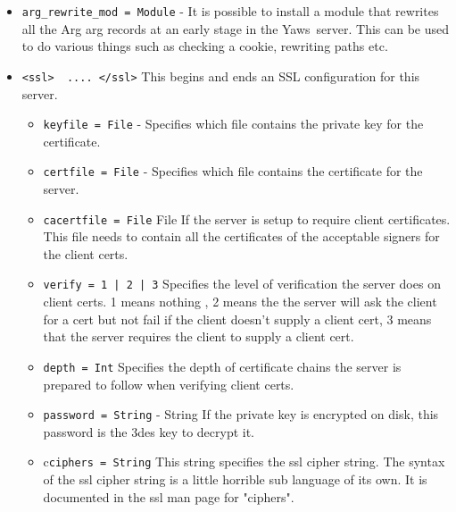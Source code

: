 \documentclass[11pt,oneside,english]{book}
\newcommand{\Yaws}            %
        {{\sc Yaws}}
\begin{document}
\begin{itemize}
\item       \verb+arg_rewrite_mod = Module+ -
              It is possible  to  install  a  module  that
              rewrites  all  the  Arg arg{} records at an
              early stage in the \Yaws\  server.  This can be
              used to do various things such as checking a
              cookie, rewriting paths etc.


\item        \verb+<ssl>  .... </ssl>+
              This begins and ends  an  SSL  configuration
              for this server.
\begin{itemize}
\item        \verb+keyfile = File+ -
              Specifies  which  file  contains the private
              key for the certificate.

\item        \verb+certfile = File+ -
              Specifies which file contains  the  certificate for the server.

\item        \verb+cacertfile = File+
              File  If  the  server  is  setup  to require
              client certificates. This file needs to contain
              all the certificates of the acceptable
              signers for the client certs.

\item        \verb+verify = 1 | 2 | 3+
              Specifies  the  level  of  verification  the
              server  does  on client certs. 1 means nothing
              , 2 means the the  server  will  ask  the
              client for a cert but not fail if the client
              doesn't supply a client cert, 3  means  that
              the  server  requires the client to supply a
              client cert.

\item        \verb+depth = Int+
              Specifies the depth  of  certificate  chains
              the  server is prepared to follow when verifying
              client certs.

\item        \verb+password = String+ -
              String If the private key  is  encrypted  on
              disk,  this  password  is  the  3des  key to
              decrypt it.

\item        c\verb+ciphers = String+
              This  string  specifies  the  ssl  cipher
              string.  The syntax of the ssl cipher string
              is a little horrible sub language of its own.
              It  is  documented  in  the ssl man page for
              "ciphers".


\end{itemize}
\end{itemize}
\end{document}
